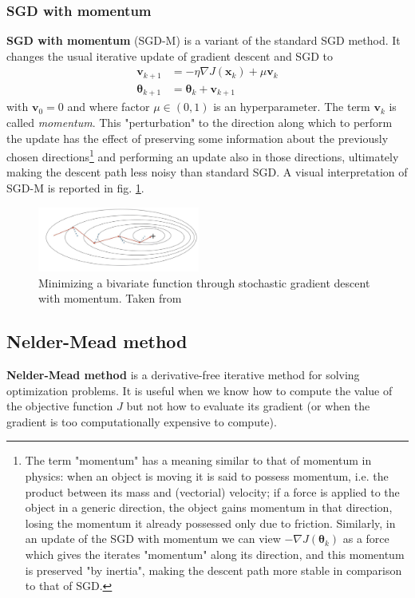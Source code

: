 \subsubsection{SGD with momentum}
\textbf{SGD with momentum} (SGD-M) \cite{sgd-m} is a variant of the standard SGD method. It changes the usual iterative update of gradient descent and SGD to
\begin{align}
\mathbf{v}_{k+1} &= -\eta \nabla J(\mathbf{x}_k) + \mu \mathbf{v}_k \\
\bm{\theta}_{k+1} &= \bm{\theta}_k + \mathbf{v}_{k+1}
\end{align}
with $\mathbf{v}_0=0$ and where factor $\mu \in (0,1)$ is an hyperparameter. The term $\mathbf{v}_k$ is called \textit{momentum}. This "perturbation" to the direction along which to perform the update has the effect of preserving some information about the previously chosen directions\footnote{The term "momentum" has a meaning similar to that of momentum in physics: when an object is moving it is said to possess momentum, i.e. the product between its mass and (vectorial) velocity; if a force is applied to the object in a generic direction, the object gains momentum in that direction, losing the momentum it already possessed only due to friction. Similarly, in an update of the SGD with momentum we can view $-\nabla J(\bm{\theta}_k)$ as a force which gives the iterates "momentum" along its direction, and this momentum is preserved "by inertia", making the descent path more stable in comparison to that of SGD.} and performing an update also in those directions, ultimately making the descent path less noisy than standard SGD. A visual interpretation of SGD-M is reported in fig. \ref{fig:sgd-m}.

\begin{figure}[hbt!]
    \centering
    \includegraphics[width=0.475\textwidth]{images/sgd-m}
    \caption[Minimizing a function through SGD-M]{Minimizing a bivariate function through stochastic gradient descent with momentum. Taken from \cite{gd_images}}
    \label{fig:sgd-m}
\end{figure}



\subsection{Nelder-Mead method}
\label{sec:nelder_mead}
\textbf{Nelder-Mead method} \cite{nelder_mead} is a derivative-free iterative method for solving optimization problems. It is useful when we know how to compute the value of the objective function $J$ but not how to evaluate its gradient (or when the gradient is too computationally expensive to compute).

